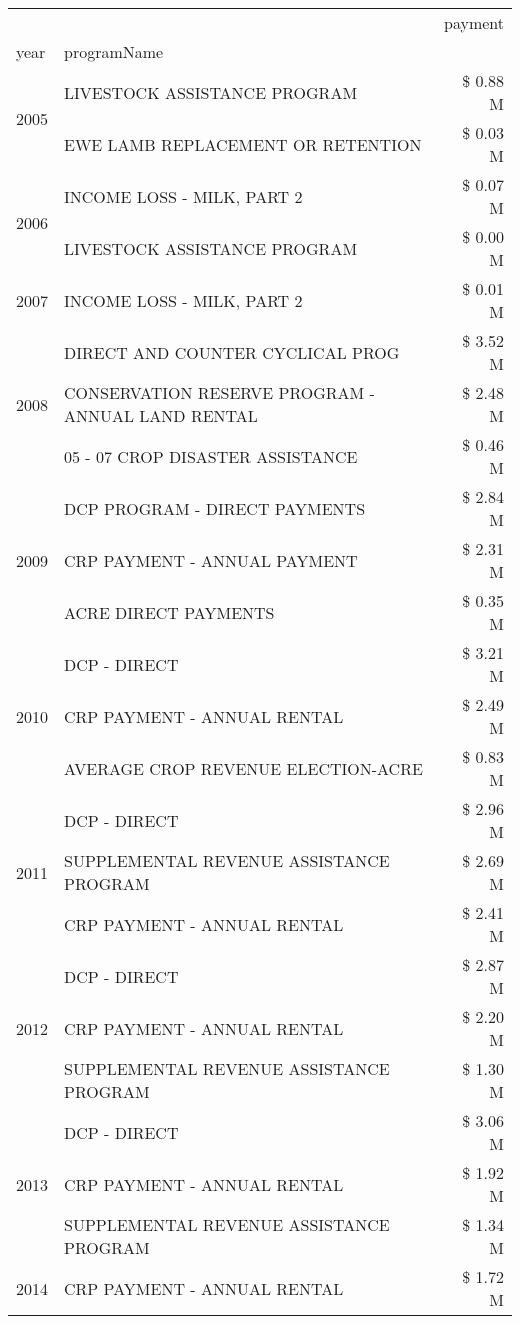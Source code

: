 \begin{tabular}{llr}
\toprule
 &  & payment \\
year & programName &  \\
\midrule
\multirow[t]{2}{*}{2005} & LIVESTOCK ASSISTANCE PROGRAM & \$ 0.88 M \\
 & EWE LAMB REPLACEMENT OR RETENTION & \$ 0.03 M \\
\cline{1-3}
\multirow[t]{2}{*}{2006} & INCOME LOSS - MILK, PART 2 & \$ 0.07 M \\
 & LIVESTOCK ASSISTANCE PROGRAM & \$ 0.00 M \\
\cline{1-3}
2007 & INCOME LOSS - MILK, PART 2 & \$ 0.01 M \\
\cline{1-3}
\multirow[t]{3}{*}{2008} & DIRECT AND COUNTER CYCLICAL PROG & \$ 3.52 M \\
 & CONSERVATION RESERVE PROGRAM - ANNUAL LAND RENTAL & \$ 2.48 M \\
 & 05 - 07 CROP DISASTER ASSISTANCE & \$ 0.46 M \\
\cline{1-3}
\multirow[t]{3}{*}{2009} & DCP PROGRAM - DIRECT PAYMENTS & \$ 2.84 M \\
 & CRP PAYMENT - ANNUAL PAYMENT & \$ 2.31 M \\
 & ACRE DIRECT PAYMENTS & \$ 0.35 M \\
\cline{1-3}
\multirow[t]{3}{*}{2010} & DCP - DIRECT & \$ 3.21 M \\
 & CRP PAYMENT - ANNUAL RENTAL & \$ 2.49 M \\
 & AVERAGE CROP REVENUE ELECTION-ACRE & \$ 0.83 M \\
\cline{1-3}
\multirow[t]{3}{*}{2011} & DCP - DIRECT & \$ 2.96 M \\
 & SUPPLEMENTAL REVENUE ASSISTANCE PROGRAM & \$ 2.69 M \\
 & CRP PAYMENT - ANNUAL RENTAL & \$ 2.41 M \\
\cline{1-3}
\multirow[t]{3}{*}{2012} & DCP - DIRECT & \$ 2.87 M \\
 & CRP PAYMENT - ANNUAL RENTAL & \$ 2.20 M \\
 & SUPPLEMENTAL REVENUE ASSISTANCE PROGRAM & \$ 1.30 M \\
\cline{1-3}
\multirow[t]{3}{*}{2013} & DCP - DIRECT & \$ 3.06 M \\
 & CRP PAYMENT - ANNUAL RENTAL & \$ 1.92 M \\
 & SUPPLEMENTAL REVENUE ASSISTANCE PROGRAM & \$ 1.34 M \\
\cline{1-3}
\multirow[t]{3}{*}{2014} & CRP PAYMENT - ANNUAL RENTAL & \$ 1.72 M \\

\end{tabular}
